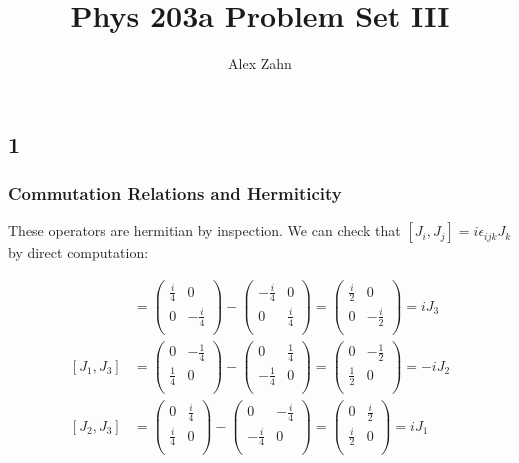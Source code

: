 \documentclass[12pt]{article}
\author{Alex Zahn}
\title{Phys 203a Problem Set III}
\date{}
\begin{document}
\maketitle

\subsection*{1}

\subsubsection*{Commutation Relations and Hermiticity}

These operators are hermitian by inspection. We can check that \([J_i,J_j]=i\epsilon_{ijk} J_k\) by direct computation:

\begin{align*}
[J_1,J_2] &= \left(
\begin{array}{cc}
 \frac{i}{4} & 0 \\
 0 & -\frac{i}{4} \\
\end{array}
\right) - \left(
\begin{array}{cc}
 -\frac{i}{4} & 0 \\
 0 & \frac{i}{4} \\
\end{array}
\right) = \left(
\begin{array}{cc}
 \frac{i}{2} & 0 \\
 0 & -\frac{i}{2} \\
\end{array}
\right) = iJ_3 \\[6pt]
[J_1,J_3] &=\left(
\begin{array}{cc}
 0 & -\frac{1}{4} \\
 \frac{1}{4} & 0 \\
\end{array}
\right)-\left(
\begin{array}{cc}
 0 & \frac{1}{4} \\
 -\frac{1}{4} & 0 \\
\end{array}
\right)=\left(
\begin{array}{cc}
 0 & -\frac{1}{2} \\
 \frac{1}{2} & 0 \\
\end{array}
\right) =-iJ_2 \\[6pt]
[J_2,J_3] &= \left(
\begin{array}{cc}
 0 & \frac{i}{4} \\
 \frac{i}{4} & 0 \\
\end{array}
\right)-\left(
\begin{array}{cc}
 0 & -\frac{i}{4} \\
 -\frac{i}{4} & 0 \\
\end{array}
\right)=\left(
\begin{array}{cc}
 0 & \frac{i}{2} \\
 \frac{i}{2} & 0 \\
\end{array}
\right)=iJ_1
\end{align*}
\end{document}

